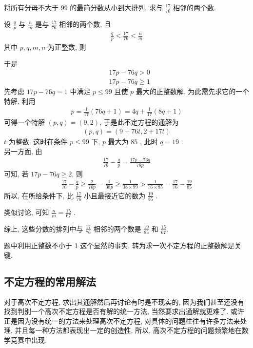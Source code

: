 \begin{example}
	将所有分母不大于 99 的最简分数从小到大排列, 求与 $\frac{17}{76}$ 相邻的两个数.
\end{example}
\begin{solution}
	设 $\frac{q}{p}$ 与 $\frac{n}{m}$ 是与 $\frac{17}{76}$ 相邻的两个数, 且
	\begin{align*}
		\frac{q}{p}<\frac{17}{76}<\frac{n}{m}
	\end{align*}
	其中 $p ,  q ,  m ,  n$ 为正整数, 则

	于是\begin{align}
		 & 17 p-76 q>0           \\
		 & 17 p-76 q \geqslant 1
	\end{align}
	先考虑 $17 p-76 q=1$ 中满足 $p \leqslant 99$ 且使 $p$ 最大的正整数解. 为此需先求它的一个特解, 利用
	\begin{align*}
		p=\frac{1}{17}(76 q+1)=4 q+\frac{1}{17}(8 q+1)
	\end{align*}
	可得一个特解 $(p, q)=(9,2)$, 于是此不定方程的通解为
	\begin{align*}
		(p, q)=(9+76 t, 2+17 t)
	\end{align*}
	$t$ 为整数. 这时在条件 $p \leqslant 99$ 下, $p$ 最大为 85 , 此时 $q=19$ . \\
	另一方面, 由
	\begin{align*}
		\frac{17}{76}-\frac{q}{p}=\frac{17 p-76 q}{76 p}
	\end{align*}
	可知, 若 $17 p-76 q \geqslant 2$, 则
	\begin{align*}
		\frac{17}{76}-\frac{q}{p} \geqslant \frac{2}{76 p}=\frac{1}{38 p} \geqslant \frac{1}{38 \times 99}>\frac{1}{76 \times 85}=\frac{17}{76}-\frac{19}{85}
	\end{align*}
	所以, 在所给条件下, 比 $\frac{17}{76}$ 小且最接近它的数为 $\frac{19}{85}$ .

	类似讨论, 可知 $\frac{n}{m}=\frac{15}{67}$ .

	综上, 这些分数的排列中与 $\frac{17}{76}$ 相邻的两个数是 $\frac{19}{85}$ 和 $\frac{15}{67}$.
\end{solution}
\begin{note}
	题中利用正整数不小于 1 这个显然的事实, 转为求一次不定方程的正整数解是关键.
\end{note}

\subsection{不定方程的常用解法}
对于高次不定方程, 求出其通解然后再讨论有时是不现实的, 因为我们甚至还没有找到判别一个高次不定方程是否有解的统一方法, 当然要求出通解就更难了. 或许正是因为没有统一的方法来处理高次不定方程, 对具体的问题往往有许多方法来处理, 并且每一种方法都表现出一定的创造性, 所以, 高次不定方程的问题频繁地在数学竞赛中出现.

